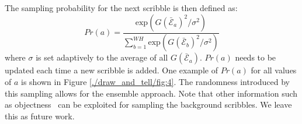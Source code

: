 
The sampling probability for the next scribble is then defined as: 
\begin{equation}
  \label{eq:sampling}
  Pr(a) = \frac{\text{exp}(G(\bar{\mathcal{E}}_a)^2 / \sigma^2)} {\sum_{b=1}^{WH} \text{exp} (G(\bar{\mathcal{E}}_b)^2 / \sigma^2)}
\end{equation}
where $\sigma$ is set adaptively to the average of all $G(\bar{\mathcal{E}}_a)$.  
$Pr(a)$ needs to be updated each time a new
scribble is added. One example of $Pr(a)$ for all values of $a$ is shown in Figure \ref{./draw_and_tell/fig:4}. 
The randomness introduced by this sampling allows for the ensemble approach. Note that other information such
as objectness~\citep{edge:box} can be exploited for sampling the background
scribbles. We leave this as future work.


